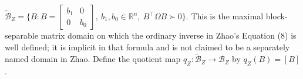 \(\widetilde{\mathcal B}_Z=\{B:B=\begin{bmatrix}b_1&0\\0&b_0\end{bmatrix},\ b_1,b_0\in\mathbb R^n,\ B^{\top}\Omega B\succ0\}\).  This is the maximal block-separable matrix domain on which the ordinary inverse in Zhao's Equation (8) is well defined; it is implicit in that formula and is not claimed to be a separately named domain in Zhao.  Define the quotient map \(q_Z:\widetilde{\mathcal B}_Z\to\mathcal B_Z\) by \(q_Z(B)=[B]\).